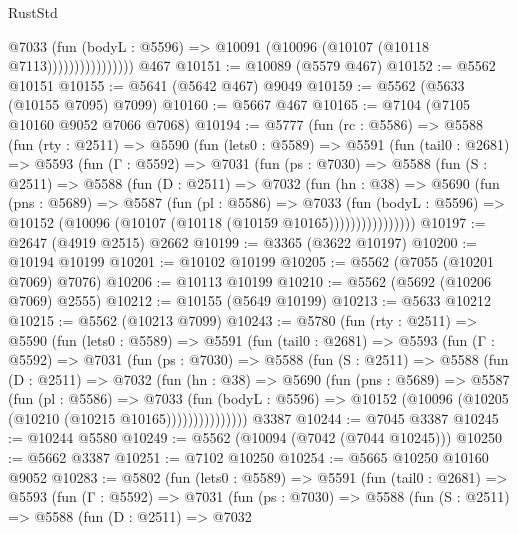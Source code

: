 \begin{lexlean}{RustStd}
\begin{coremodule}
                          @7033
                            (fun (bodyL : @5596) =>
                            @10091 (@10096 (@10107 (@10118 @7113))))))))))))))))
    @467
@10151 := @10089 (@5579 @467)
@10152 := @5562 @10151
@10155 := @5641 (@5642 @467) @9049
@10159 := @5562 (@5633 (@10155 @7095) @7099)
@10160 := @5667 @467
@10165 := @7104 (@7105 @10160 @9052 @7066 @7068)
@10194 := @5777
    (fun (rc : @5586) =>
    @5588
      (fun (rty : @2511) =>
      @5590
        (fun (lets0 : @5589) =>
        @5591
          (fun (tail0 : @2681) =>
          @5593
            (fun (Γ : @5592) =>
            @7031
              (fun (ps : @7030) =>
              @5588
                (fun (S : @2511) =>
                @5588
                  (fun (D : @2511) =>
                  @7032
                    (fun (hn : @38) =>
                    @5690
                      (fun (pns : @5689) =>
                      @5587
                        (fun (pl : @5586) =>
                        @7033
                          (fun (bodyL : @5596) =>
                          @10152 (@10096 (@10107 (@10118 (@10159 @10165))))))))))))))))
@10197 := @2647 (@4919 @2515) @2662
@10199 := @3365 (@3622 @10197)
@10200 := @10194 @10199
@10201 := @10102 @10199
@10205 := @5562 (@7055 (@10201 @7069) @7076)
@10206 := @10113 @10199
@10210 := @5562 (@5692 (@10206 @7069) @2555)
@10212 := @10155 (@5649 @10199)
@10213 := @5633 @10212
@10215 := @5562 (@10213 @7099)
@10243 := @5780
    (fun (rty : @2511) =>
    @5590
      (fun (lets0 : @5589) =>
      @5591
        (fun (tail0 : @2681) =>
        @5593
          (fun (Γ : @5592) =>
          @7031
            (fun (ps : @7030) =>
            @5588
              (fun (S : @2511) =>
              @5588
                (fun (D : @2511) =>
                @7032
                  (fun (hn : @38) =>
                  @5690
                    (fun (pns : @5689) =>
                    @5587
                      (fun (pl : @5586) =>
                      @7033
                        (fun (bodyL : @5596) =>
                        @10152 (@10096 (@10205 (@10210 (@10215 @10165)))))))))))))))
    @3387
@10244 := @7045 @3387
@10245 := @10244 @5580
@10249 := @5562 (@10094 (@7042 (@7044 @10245)))
@10250 := @5662 @3387
@10251 := @7102 @10250
@10254 := @5665 @10250 @10160 @9052
@10283 := @5802
    (fun (lets0 : @5589) =>
    @5591
      (fun (tail0 : @2681) =>
      @5593
        (fun (Γ : @5592) =>
        @7031
          (fun (ps : @7030) =>
          @5588
            (fun (S : @2511) =>
            @5588
              (fun (D : @2511) =>
              @7032

\end{coremodule}
\end{lexlean}

